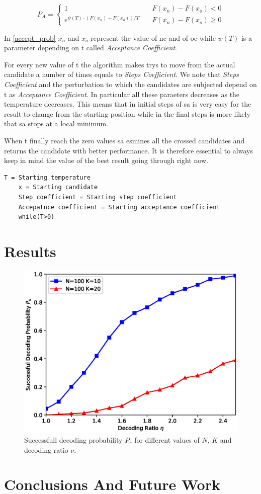 \documentclass[journal]{IEEEtran}
\begin{document}
 \begin{equation}
 	\label{accept_prob}
	P_A = \begin{cases}
		1 & \quad F(x_n)-F(x_o) < 0 \\
		e^{\psi(T)\cdot(F(x_n)-F(x_o))/T } & \quad F(x_n)-F(x_o) \geq 0
\end{cases}
 \end{equation}

In \ref{accept_prob} $x_n$ and $x_o$ represent the value of \gls{nc} and of \gls{oc} while $\psi(T)$ is a parameter depending on \gls{t} called \textit{Acceptance Coefficient}.

For every new value of \gls{t} the algorithm makes trys to move from the actual candidate a number of times equals to \textit{Steps Coefficient}. We note that \textit{Steps Coefficient} and the perturbation to which the candidates are subjected depend on \gls{t} as \textit{Acceptance Coefficient}. In particular all these paraeters decreases as the temperature decreases. This means that in initial steps of \gls{sa} is very easy for the result to change from the starting position while in the final steps is more likely that \gls{sa} stops at a local minimum.

When \gls{t} finally reach the zero values \gls{sa} esmines all the crossed candidates and returns the candidate with better performance.
It is therefore essential to always keep in mind the value of the best result going through right now.

\begin{lstlisting}[frame=single]
	T = Starting temperature
	x = Starting candidate
	Step coefficient = Starting step coefficient
	Accepatnce coefficient = Starting acceptance coefficient
	while(T>0)

\end{lstlisting}

\section{Results}
\label{sec:results}
\begin{figure}
  \centering
	    \includegraphics[width=0.9\columnwidth]{ratiovsprob.eps}
  \caption{Successfull decoding probability $P_s$ for different values of $N$, $K$ and decoding ratio $\nu$.}
  \label{fig:ratiovsprob}
\end{figure}

\section{Conclusions And Future Work}
\label{sec:conclusions}



\end{document}

